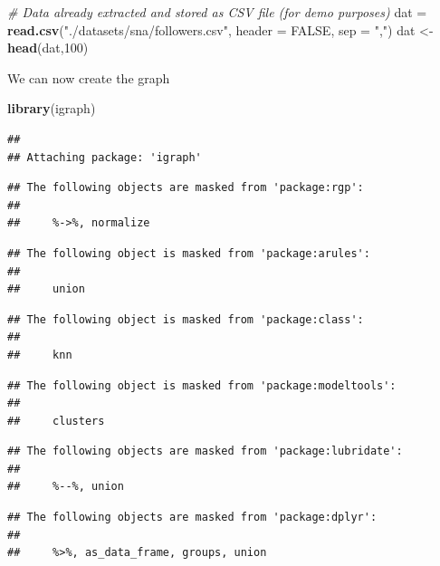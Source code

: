 \documentclass[]{book}
\newenvironment{Shaded}{\begin{snugshade}}{\end{snugshade}}
\newcommand{\KeywordTok}[1]{\textcolor[rgb]{0.13,0.29,0.53}{\textbf{{#1}}}}
\newcommand{\DataTypeTok}[1]{\textcolor[rgb]{0.13,0.29,0.53}{{#1}}}
\newcommand{\DecValTok}[1]{\textcolor[rgb]{0.00,0.00,0.81}{{#1}}}
\newcommand{\StringTok}[1]{\textcolor[rgb]{0.31,0.60,0.02}{{#1}}}
\newcommand{\CommentTok}[1]{\textcolor[rgb]{0.56,0.35,0.01}{\textit{{#1}}}}
\newcommand{\OtherTok}[1]{\textcolor[rgb]{0.56,0.35,0.01}{{#1}}}
\newcommand{\NormalTok}[1]{{#1}}
\begin{document}
\begin{Shaded}
\begin{Highlighting}[]
\CommentTok{# Data already extracted and stored as CSV file (for demo purposes)}
\NormalTok{dat =}\StringTok{ }\KeywordTok{read.csv}\NormalTok{(}\StringTok{"./datasets/sna/followers.csv"}\NormalTok{, }\DataTypeTok{header =} \OtherTok{FALSE}\NormalTok{, }\DataTypeTok{sep =} \StringTok{","}\NormalTok{)}
\NormalTok{dat <-}\StringTok{ }\KeywordTok{head}\NormalTok{(dat,}\DecValTok{100}\NormalTok{)}
\end{Highlighting}
\end{Shaded}

We can now create the graph

\begin{Shaded}
\begin{Highlighting}[]
\KeywordTok{library}\NormalTok{(igraph)}
\end{Highlighting}
\end{Shaded}

\begin{verbatim}
## 
## Attaching package: 'igraph'
\end{verbatim}

\begin{verbatim}
## The following objects are masked from 'package:rgp':
## 
##     %->%, normalize
\end{verbatim}

\begin{verbatim}
## The following object is masked from 'package:arules':
## 
##     union
\end{verbatim}

\begin{verbatim}
## The following object is masked from 'package:class':
## 
##     knn
\end{verbatim}

\begin{verbatim}
## The following object is masked from 'package:modeltools':
## 
##     clusters
\end{verbatim}

\begin{verbatim}
## The following objects are masked from 'package:lubridate':
## 
##     %--%, union
\end{verbatim}

\begin{verbatim}
## The following objects are masked from 'package:dplyr':
## 
##     %>%, as_data_frame, groups, union
\end{verbatim}
\end{document}
